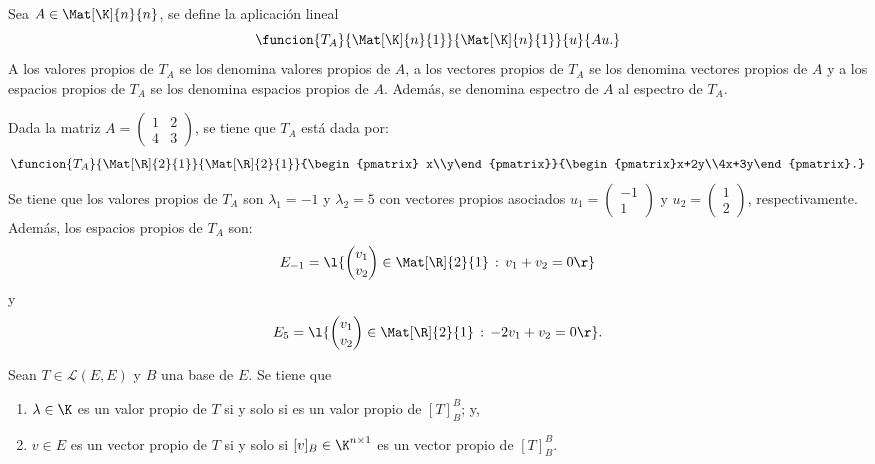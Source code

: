 \documentclass[compacto,10pt]{pubciencias-notas}
\begin{document}
\begin{defi}
Sea $A\in \Mat[\K]{n}{n}$,
se define la aplicación lineal
\[
    \funcion{T_A}{\Mat[\K]{n}{1}}{\Mat[\K]{n}{1}}{u}{Au.}
\]
A los valores propios de $T_A$ se los denomina valores propios de $A$, a los vectores propios de $T_A$ se los denomina vectores propios de $A$ y a los espacios propios de $T_A$ se los denomina espacios propios de $A$. Además, se denomina espectro de $A$ al espectro de $T_A$.
\end{defi}

\begin{ejem}\hspace{0pt}\label{Cap7:ejem02} Dada la matriz $A = \begin{pmatrix}1&2\\4&3\end{pmatrix}$, se tiene que $T_{A}$ está dada por:
\[
    \funcion{T_A}{\Mat[\R]{2}{1}}{\Mat[\R]{2}{1}}{\begin{pmatrix}
     x\\y\end{pmatrix}}{\begin{pmatrix}x+2y\\4x+3y\end{pmatrix}.}
\]
Se tiene que los valores propios de $T_{A}$ son $\lambda_{1} = -1$ y $\lambda_{2} = 5$ con vectores propios asociados $u_{1} = \begin{pmatrix}-1\\1\end{pmatrix}$ y $u_{2} = \begin{pmatrix}1\\2\end{pmatrix}$, respectivamente. Además, los espacios propios de $T_{A}$ son:
\[
    E_{-1} = \l\{\begin{pmatrix}v_{1}\\v_{2}\end{pmatrix}\in\Mat[\R]{2}{1}\,:\,v_{1}+v_{2}=0\r\}
\]
y 
\[
    E_{5} = \l\{\begin{pmatrix}v_{1}\\v_{2}\end{pmatrix}\in\Mat[\R]{2}{1}\,:\,-2v_{1}+v_{2}=0\r\}.
\]
\end{ejem}

\begin{prop}
Sean $T \in \mathscr{L}(E,E)$ y $B$ una base de $E$. Se tiene que
\begin{enumerate}
\item
    $\lambda\in\K$ es un valor propio de $T$ si y solo si es un valor propio de $[T]_B^B$; y,
\item
    $v\in E$ es un vector propio de $T$ si y solo si $[v]_{B}\in\K^{n\times1}$ es un vector propio de $[T]_B^B$.
\end{enumerate}
\end{prop}
\end{document}
